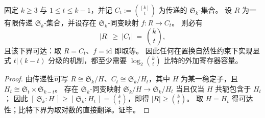 \begin{proposition}\label{prop:bdry-equvariant-register-min-degree-choose}
固定 \(k\ge 3\) 与 \(1\le t\le k-1\)，并记 \(C_t:=\binom{[k]}{t}\) 为传递的 \(\mathfrak S_k\)-集合。
设 \(R\) 为一有限传递 \(\mathfrak S_k\)-集合，并设存在 \(\mathfrak S_k\)-同变映射 \(f:R\to C_t\)。
则必有
\[
|R|\ \ge\ |C_t|\ =\ \binom{k}{t},
\]
且该下界可达：取 \(R=C_t\)、\(f=\mathrm{id}\) 即取等。
因此任何在置换自然性约束下实现显式 \(t|(k-t)\) 分级的机制，都至少需要 \(\log_2\binom{k}{t}\) 比特的外加寄存器容量。
\end{proposition}
\begin{proof}
由传递性可写 \(R\cong \mathfrak S_k/H\)、\(C_t\cong \mathfrak S_k/H_t\)，其中 \(H\) 为某一稳定子，且 \(H_t\cong \mathfrak S_t\times \mathfrak S_{k-t}\)。
存在 \(\mathfrak S_k\)-同变映射 \(\mathfrak S_k/H\to \mathfrak S_k/H_t\) 当且仅当 \(H\) 共轭包含于 \(H_t\)；
因此 \([\,\mathfrak S_k:H\,]\ge [\,\mathfrak S_k:H_t\,]=\binom{k}{t}\)，即得 \(|R|\ge \binom{k}{t}\)。
取 \(H=H_t\) 得可达性；比特下界为取对数的直接翻译。证毕。
\end{proof}

\endinput
